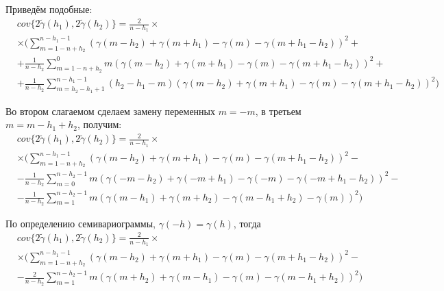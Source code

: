 Приведём подобные:
\begin{eqnarray*}
\nonumber
	& cov\{ 2 \tilde{\gamma}(h_1), 2 \tilde{\gamma}(h_2) \} = \frac{2}{n - h_1} \times \\
	& \times (\sum_{m = 1 - n + h_2}^{n - h_1 - 1} (\gamma(m - h_2) + \gamma(m + h_1) - \gamma(m) - \gamma(m + h_1 - h_2))^2 + \\
	& + \frac{1}{n - h_2} \sum_{m = 1 - n + h_2}^{0} m (\gamma(m - h_2) + \gamma(m + h_1) - \gamma(m) - \gamma(m + h_1 - h_2))^2 + \\
	& + \frac{1}{n - h_2} \sum_{m = h_2 - h_1 + 1}^{n - h_1 - 1} (h_2 - h_1 - m) (\gamma(m - h_2) + \gamma(m + h_1) - \gamma(m) - \gamma(m + h_1 - h_2))^2)
\end{eqnarray*}

Во втором слагаемом сделаем замену переменных $ m = -m $, в третьем $ m = m - h_1 + h_2 $, получим:
\begin{eqnarray*}
\nonumber
	& cov\{ 2 \tilde{\gamma}(h_1), 2 \tilde{\gamma}(h_2) \} = \frac{2}{n - h_1} \times \\
	& \times (\sum_{m = 1 - n + h_2}^{n - h_1 - 1} (\gamma(m - h_2) + \gamma(m + h_1) - \gamma(m) - \gamma(m + h_1 - h_2))^2 - \\
	& - \frac{1}{n - h_2} \sum_{m = 0}^{n - h_2 - 1} m (\gamma(-m - h_2) + \gamma(-m + h_1) - \gamma(-m) - \gamma(-m + h_1 - h_2))^2 - \\
	& - \frac{1}{n - h_2} \sum_{m = 1}^{n - h_2 - 1} m (\gamma(m - h_1) + \gamma(m + h_2) - \gamma(m - h_1 + h_2) - \gamma(m))^2)
\end{eqnarray*}

По определению семивариограммы, $ \gamma(-h) = \gamma(h) $, тогда
\begin{eqnarray*}
\nonumber
	& cov\{ 2 \tilde{\gamma}(h_1), 2 \tilde{\gamma}(h_2) \} = \frac{2}{n - h_1} \times \\
	& \times (\sum_{m = 1 - n + h_2}^{n - h_1 - 1} (\gamma(m - h_2) + \gamma(m + h_1) - \gamma(m) - \gamma(m + h_1 - h_2))^2 - \\
	& - \frac{2}{n - h_2} \sum_{m = 1}^{n - h_2 - 1} m (\gamma(m + h_2) + \gamma(m - h_1) - \gamma(m) - \gamma(m - h_1 + h_2))^2)
\end{eqnarray*}
